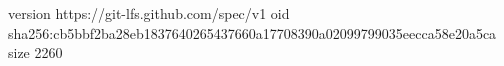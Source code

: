 version https://git-lfs.github.com/spec/v1
oid sha256:cb5bbf2ba28eb1837640265437660a17708390a02099799035eecca58e20a5ca
size 2260
